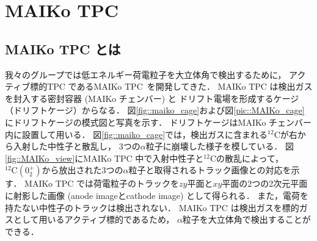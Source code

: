 \documentclass[../master]{subfiles}
\begin{document}
\chapter{MAIKo TPC}
\section{MAIKo TPC とは}
我々のグループでは低エネルギー荷電粒子を大立体角で検出するために，
アクティブ標的TPC であるMAIKo TPC~\cite{maiko}を開発してきた．
MAIKo TPC は検出ガスを封入する密封容器 (MAIKo チェンバー) と
ドリフト電場を形成するケージ（ドリフトケージ）からなる．
図\ref{fig::maiko_cage}および図\ref{pic::MAIKo_cage}にドリフトケージの模式図と写真を示す．
ドリフトケージはMAIKo チェンバー内に設置して用いる．
図\ref{fig::maiko_cage}では，検出ガスに含まれる${}^{12}\mathrm{C}$が右から入射した中性子と散乱し，
3つの$\alpha$粒子に崩壊した様子を模している．
図\ref{fig::MAIKo_view}にMAIKo TPC 中で入射中性子と${}^{12}\mathrm{C}$の散乱によって，
${}^{12}\mathrm{C} (0_2^+)$から放出された3つの$\alpha$粒子と取得されるトラック画像との対応を示す．
MAIKo TPC では荷電粒子のトラックを$zy$平面と$xy$平面の2つの2次元平面に射影した画像
(anode imageとcathode image) として得られる．
また，電荷を持たない中性子のトラックは検出されない．
MAIKo TPC は検出ガスを標的ガスとして用いるアクティブ標的であるため，
$\alpha$粒子を大立体角で検出することができる．
\end{document}
